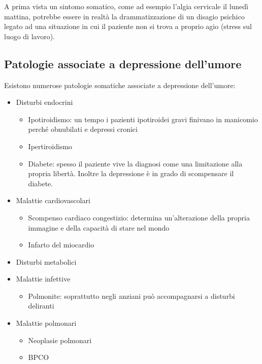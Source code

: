 A prima vista un sintomo somatico, come ad esempio l'algia cervicale il
lunedì mattina, potrebbe essere in realtà la drammatizzazione di un
disagio psichico legato ad una situazione in cui il paziente non si
trova a proprio agio (stress sul luogo di lavoro).

\subsection{Patologie associate a depressione dell'umore}


Esistono numerose patologie somatiche associate a depressione
dell'umore:

\begin{itemize}
\item
  Disturbi endocrini

\begin{itemize}
\item
  Ipotiroidismo: un tempo i pazienti ipotiroidei gravi finivano in
  manicomio perché obnubilati e depressi cronici
\item
  Ipertiroidismo
\item
  Diabete: spesso il paziente vive la diagnosi come una limitazione alla
  propria libertà. Inoltre la depressione è in grado di scompensare il
  diabete.
\end{itemize}

\item
  Malattie cardiovascolari

\begin{itemize}
\item
  Scompenso cardiaco congestizio: determina un'alterazione della propria
  immagine e della capacità di stare nel mondo
\item
  Infarto del miocardio
\end{itemize}

\item
  Disturbi metabolici
\item
  Malattie infettive

\begin{itemize}
\item
  Polmonite: soprattutto negli anziani può accompagnarsi a disturbi
  deliranti
\end{itemize}

\item
  Malattie polmonari

\begin{itemize}
\item
  Neoplasie polmonari
\item
  BPCO
\end{itemize}


\end{itemize}

